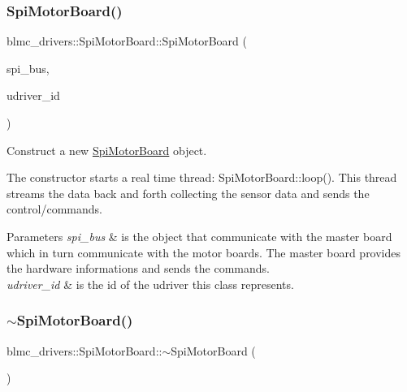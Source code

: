 \subsubsection{\texorpdfstring{Spi\+Motor\+Board()}{SpiMotorBoard()}}
{\footnotesize\ttfamily blmc\+\_\+drivers\+::\+Spi\+Motor\+Board\+::\+Spi\+Motor\+Board (\begin{DoxyParamCaption}\item[{std\+::shared\+\_\+ptr$<$ \hyperlink{classblmc__drivers_1_1SpiBus}{Spi\+Bus} $>$}]{spi\+\_\+bus,  }\item[{const size\+\_\+t}]{udriver\+\_\+id }\end{DoxyParamCaption})}



Construct a new \hyperlink{classblmc__drivers_1_1SpiMotorBoard}{Spi\+Motor\+Board} object. 

The constructor starts a real time thread\+: Spi\+Motor\+Board\+::loop(). This thread streams the data back and forth collecting the sensor data and sends the control/commands.


\begin{DoxyParams}{Parameters}
{\em spi\+\_\+bus} & is the object that communicate with the master board which in turn communicate with the motor boards. The master board provides the hardware informations and sends the commands. \\
\hline
{\em udriver\+\_\+id} & is the id of the udriver this class represents. \\
\hline
\end{DoxyParams}
\mbox{\label{classblmc__drivers_1_1SpiMotorBoard_a3bc0c19b79504a96426646090c7fbc54}} 
\subsubsection{\texorpdfstring{$\sim$\+Spi\+Motor\+Board()}{~SpiMotorBoard()}}
{\footnotesize\ttfamily blmc\+\_\+drivers\+::\+Spi\+Motor\+Board\+::$\sim$\+Spi\+Motor\+Board (\begin{DoxyParamCaption}{ }\end{DoxyParamCaption})}



